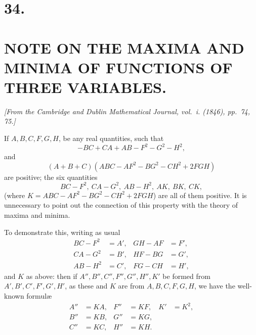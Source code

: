 \documentclass[11pt]{article}
\begin{document}
\newpage
\section*{34.}
\section*{NOTE ON THE MAXIMA AND MINIMA OF FUNCTIONS OF THREE VARIABLES.}

\textit{[From the Cambridge and Dublin Mathematical Journal, vol.~i. (1846), pp.~74, 75.]}

\bigskip
\setcounter{page}{228}

If $A, B, C, F, G, H$, be any real quantities, such that
\[
-BC + CA + AB - F^2 - G^2 - H^2,
\]
and
\[
(A + B + C)(ABC - AF^2 - BG^2 - CH^2 + 2FGH)
\]
are positive; the six quantities
\[
BC - F^2,\ CA - G^2,\ AB - H^2,\ AK,\ BK,\ CK,
\]
(where $K = ABC - AF^2 - BG^2 - CH^2 + 2FGH$) are all of them positive. It is unnecessary to point out the connection of this property with the theory of maxima and minima.

To demonstrate this, writing as usual
\begin{align*}
BC - F^2 &= A',& GH - AF &= F',\\
CA - G^2 &= B',& HF - BG &= G',\\
AB - H^2 &= C',& FG - CH &= H',
\end{align*}
and $K$ as above: then if $A'', B'', C'', F'', G'', H'', K'$ be formed from $A', B', C', F', G', H'$, as these and $K$ are from $A, B, C, F, G, H$, we have the well-known formul\ae
\begin{align*}
A'' &= KA,& F'' &= KF,& K' &= K^2,\\
B'' &= KB,& G'' &= KG,&\\
C'' &= KC,& H'' &= KH.
\end{align*}
\end{document}
